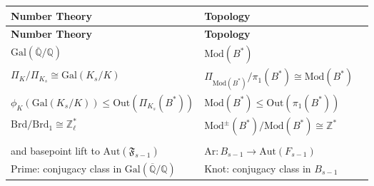 \documentclass[10pt]{amsart}
\theoremstyle{definition}
\newcommand{\A}{{ \mathrm{Aut} }}
\newcommand{\Gal}{{ \mathrm{Gal}}}
\begin{document}
{\small
\begin{longtable}[c]{>{\raggedright\arraybackslash}p{6cm}  >{\raggedright\arraybackslash}p{5cm}  >{\raggedright\arraybackslash}p{4.5cm}}
\rowcolor{headerblue}
\textbf{Number Theory} & \textbf{Topology}  \\
\endfirsthead

\rowcolor{headerblue}
\textbf{Number Theory} & \textbf{Topology}  \\
\endhead

\rowcolor{rowgray}
$\Gal(\overline{\mathbb{Q}}/\mathbb{Q})$ 
  & $\mathrm{Mod}(B^*)$ 
  \\

$\Pi_K/\Pi_{K_s} \cong \Gal(K_s/K)$ 
  & $\Pi_{\mathrm{Mod}(B^*)}/\pi_1(B^*) \cong \mathrm{Mod}(B^*)$ 
   \\

\rowcolor{rowgray}
$\phi_K(\Gal(K_s/K)) \leq \mathrm{Out}(\Pi_{K_s}(B^*))$ 
  & $\mathrm{Mod}(B^*) \leq \mathrm{Out}(\pi_1(B^*))$ 
   \\

$\mathrm{Brd}/\mathrm{Brd}_1 \cong \mathbb{Z}_\ell^*$ 
  & $\mathrm{Mod}^\pm(B^*)/\mathrm{Mod}(B^*) \cong \mathbb{Z}^*$ 
   \\

\rowcolor{rowgray}
\begin{tabular}[t]{@{}l@{}}
$\mathrm{Ih} \colon \Gal(K_s/K) \to \mathrm{Brd}(\mathfrak{F}_{s-1})$ \\ 
and basepoint lift to $\A(\mathfrak{F}_{s-1})$
\end{tabular}
  & $\mathrm{Ar} \colon B_{s-1} \to \A(F_{s-1})$ 
   \\

Prime: conjugacy class in $\Gal(\overline{\mathbb{Q}}/\mathbb{Q})$ 
  & Knot: conjugacy class in $B_{s-1}$ 
   \\
\end{longtable}
}
\end{document}
